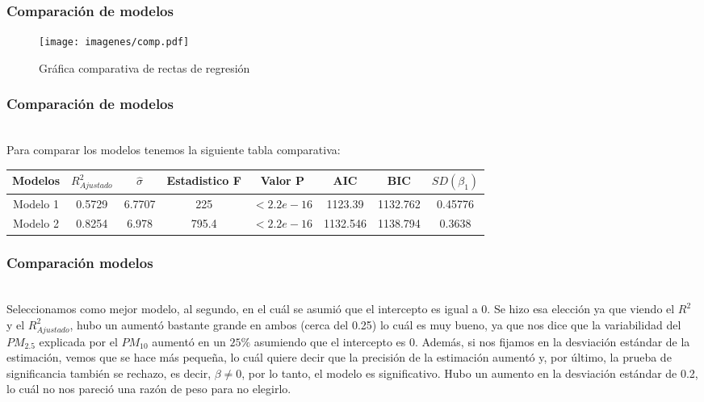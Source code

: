 \documentclass[12pt]{beamer}
\begin{document}
\begin{frame}
\frametitle{Comparación de modelos}
\begin{figure}[h]
  \centering
  \texttt{[image: imagenes/comp.pdf]}
  \caption{Gráfica comparativa de rectas de regresión}\label{figura1}
\end{figure}
\end{frame}

\begin{frame}
\frametitle{Comparación de modelos}
~\\Para comparar los modelos tenemos la siguiente tabla comparativa:
\resizebox{12.2cm}{!} {
\begin{tabular}{|c|c|c|c|c|c|c|c|}
 \hline 
 Modelos & $R^{2}_{Ajustado}$ & $\hat{\sigma}$ & Estadistico F & Valor P & AIC & BIC & $SD(\beta_{1})$ \\ 
 \hline 
 Modelo 1 & 0.5729 & 6.7707 & 225 & $<2.2e-16$ & 1123.39 & 1132.762 & 0.45776  \\ 
 \hline 
 Modelo 2 & 0.8254 & 6.978 & 795.4 & $<2.2e-16$ & 1132.546 & 1138.794 & 0.3638\\ 
 \hline 
 \end{tabular}
 }  
\end{frame}

\begin{frame}
\frametitle{Comparación modelos}
~\\Seleccionamos como mejor modelo, al segundo, en el cuál se asumió que el intercepto es igual a 0. Se hizo esa elección ya que viendo el $R^2$ y el $R^2_{Ajustado}$, hubo un aumentó bastante grande en ambos (cerca del 0.25) lo cuál es muy bueno, ya que nos dice que la variabilidad del $PM_{2.5}$ explicada por el $PM_{10}$ aumentó en un $25\%$ asumiendo que el intercepto es 0. Además, si nos fijamos en la desviación estándar de la estimación, vemos que se hace más pequeña, lo cuál quiere decir que la precisión de la estimación aumentó y, por último, la prueba de significancia también se rechazo, es decir, $\beta\neq 0$, por lo tanto, el modelo es significativo. Hubo un aumento en la desviación estándar de 0.2, lo cuál no nos pareció una razón de peso para no elegirlo.
\end{frame}
\end{document}
